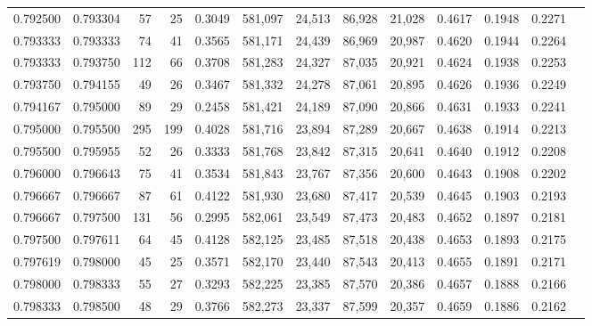 \begin{tabular}{rrrrrrrrrrrrr}
0.792500 & 0.793304 &    57 &  25 &                                     0.3049 & 581,097 &  24,513 &  86,928 &  21,028 & 0.4617 & 0.1948 & 0.2271 \\
0.793333 & 0.793333 &    74 &  41 &                                     0.3565 & 581,171 &  24,439 &  86,969 &  20,987 & 0.4620 & 0.1944 & 0.2264 \\
0.793333 & 0.793750 &   112 &  66 &                                     0.3708 & 581,283 &  24,327 &  87,035 &  20,921 & 0.4624 & 0.1938 & 0.2253 \\
0.793750 & 0.794155 &    49 &  26 &                                     0.3467 & 581,332 &  24,278 &  87,061 &  20,895 & 0.4626 & 0.1936 & 0.2249 \\
0.794167 & 0.795000 &    89 &  29 &                                     0.2458 & 581,421 &  24,189 &  87,090 &  20,866 & 0.4631 & 0.1933 & 0.2241 \\
0.795000 & 0.795500 &   295 & 199 &                                     0.4028 & 581,716 &  23,894 &  87,289 &  20,667 & 0.4638 & 0.1914 & 0.2213 \\
0.795500 & 0.795955 &    52 &  26 &                                     0.3333 & 581,768 &  23,842 &  87,315 &  20,641 & 0.4640 & 0.1912 & 0.2208 \\
0.796000 & 0.796643 &    75 &  41 &                                     0.3534 & 581,843 &  23,767 &  87,356 &  20,600 & 0.4643 & 0.1908 & 0.2202 \\
0.796667 & 0.796667 &    87 &  61 &                                     0.4122 & 581,930 &  23,680 &  87,417 &  20,539 & 0.4645 & 0.1903 & 0.2193 \\
0.796667 & 0.797500 &   131 &  56 &                                     0.2995 & 582,061 &  23,549 &  87,473 &  20,483 & 0.4652 & 0.1897 & 0.2181 \\
0.797500 & 0.797611 &    64 &  45 &                                     0.4128 & 582,125 &  23,485 &  87,518 &  20,438 & 0.4653 & 0.1893 & 0.2175 \\
0.797619 & 0.798000 &    45 &  25 &                                     0.3571 & 582,170 &  23,440 &  87,543 &  20,413 & 0.4655 & 0.1891 & 0.2171 \\
0.798000 & 0.798333 &    55 &  27 &                                     0.3293 & 582,225 &  23,385 &  87,570 &  20,386 & 0.4657 & 0.1888 & 0.2166 \\
0.798333 & 0.798500 &    48 &  29 &                                     0.3766 & 582,273 &  23,337 &  87,599 &  20,357 & 0.4659 & 0.1886 & 0.2162 \\

\end{tabular}
